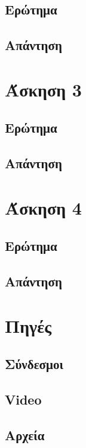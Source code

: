 \documentclass[12pt, fleqn, leqno]{extreport}
\begin{document}
\section{Ερώτημα}

\newpage
\section{Απάντηση}

\chapter{Άσκηση 3}
\section{Ερώτημα}

\newpage
\section{Απάντηση}

\chapter{Άσκηση 4}
\section{Ερώτημα}

\newpage
\section{Απάντηση}

\chapter{Πηγές}
\section{Σύνδεσμοι}
\section{Video}
\section{Αρχεία}
\end{document}

